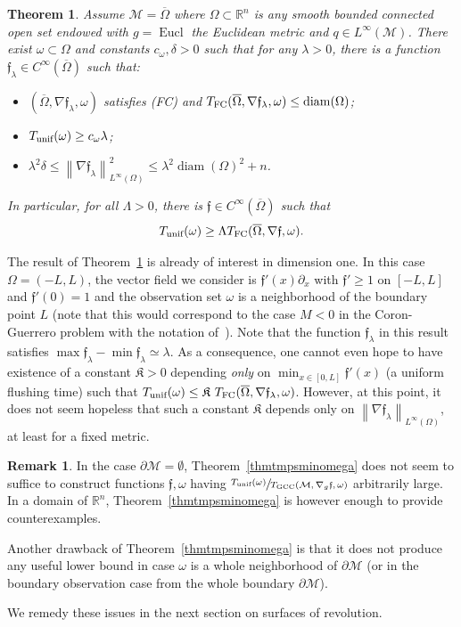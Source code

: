 \documentclass[JEP,XML,SOM,Unicode]{cedram}
\newcommand{\FC}{\textup{FC}}
\newcommand{\pFC}{\textup{(FC)}\xspace}
\newcommand{\GCC}{\textup{GCC}}
\newcommand{\unif}{\textup{unif}}
\newtheorem{theorem}[lemma]{Theorem}
\theoremstyle{definition}
\newtheorem{remark}[lemma]{Remark}
\newcommand{\M}{\ensuremath{\mathcal M}}
\newcommand{\mb}[1]{\ensuremath{\mathbb{#1}}}
\newcommand{\R}{{\mb{R}}}
\newcommand{\f}{\ensuremath{\mathfrak{f}}}
\DeclareMathOperator{\Eucl}{Eucl}
\DeclareMathOperator{\diam}{diam}
\newcommand\nablag{\nabla_{g}}
\newcommand\nor[2]{\left\|#1\right\|_{#2}}
\let\d\partial
\let\ovl\overline
\begin{document}
\begin{theorem}
\label{thm:counterexamplesomega}
Assume $\M = \ovl{\Omega}$ where $\Omega \subset \R^n$ is any smooth bounded connected open set endowed with $g=\Eucl$ the Euclidean metric and $q \in L^\infty(\M)$. There exist $\omega\subset \Omega$ and constants $c_\omega,\delta>0$ such that for any $\lambda>0$, there is a function $\f_\lambda \in C^\infty(\ovl{\Omega})$ such that:
\begin{itemize}
\item $(\ovl{\Omega},\nabla \f_\lambda,\omega)$ satisfies \pFC and $T_{\FC}(\ovl{\Omega},\nabla \f_\lambda,\omega) \leq \diam(\Omega)$;
\item $T_{\unif}(\omega)\geq c_\omega \lambda$;
\item $ \lambda^2\delta\leq \nor{\nabla \f_\lambda}{L^\infty(\Omega)}^2 \leq \lambda^2 \diam(\Omega)^{2}+n$.
\end{itemize}
In particular, for all $\Lambda >0$, there is $\f \in C^\infty(\ovl{\Omega})$ such that
\[
T_{\unif}(\omega) \geq \Lambda T_{\FC}(\ovl{\Omega},\nabla \f,\omega).
\]
\end{theorem}
The result of Theorem~\ref{thm:counterexamplesomega} is already of interest in dimension one. In this case $\Omega = (-L,L)$, the vector field we consider is $\f'(x)\d_x$ with $\f'\geq 1$ on $[-L,L]$ and $\f'(0)=1$ and the observation set $\omega$ is a neighborhood of the boundary point $L$ (note that this would correspond to the case $M<0$ in the Coron-Guerrero problem with the notation of~\cite{CG:05}).
Note that the function $\f_\lambda$ in this result satisfies $\max \f_\lambda - \min \f_\lambda \simeq \lambda$.
As a consequence, one cannot even hope to have existence of a constant $\mathfrak{K}>0$ depending {\em only} on $\min_{x\in [0,L]}\f'(x)$ (a uniform flushing time) such that $T_{\unif}(\omega) \leq \mathfrak{K} \ T_{\FC}(\ovl{\Omega},\nabla \f_\lambda,\omega)$.
However, at this point, it does not seem hopeless that such a constant $\mathfrak{K}$ depends only on $\nor{\nabla \f_\lambda}{L^\infty(\Omega)}$, at least for a fixed metric.

\begin{remark}
In the case $\d\M = \emptyset$, Theorem~\ref{thmtmpsminomega} does not seem to suffice to construct functions $\f, \omega$ having $\sfrac{T_{\unif}(\omega)}{T_{\GCC}(\M,\nablag\f,\omega)}$ arbitrarily large. In a domain of $\R^n$, Theorem~\ref{thmtmpsminomega} is however enough to provide counterexamples.

Another drawback of Theorem~\ref{thmtmpsminomega} is that it does not produce any useful lower bound in case $\omega$ is a whole neighborhood of $\d\M$ (or in the boundary observation case from the whole boundary $\d\M$).

We remedy these issues in the next section on surfaces of revolution.
\end{remark}
\end{document}
